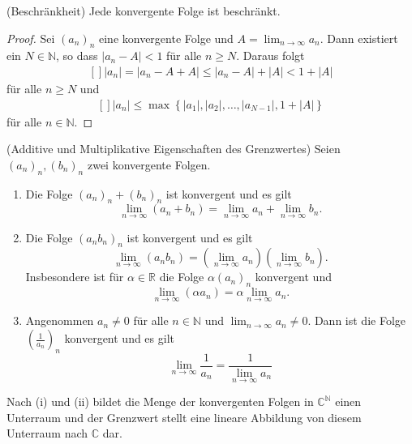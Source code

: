 \documentclass[../Analysis1_script.tex]{subfiles}
\begin{document}
\begin{lemma}{(Beschränkheit)}
	Jede konvergente Folge ist beschränkt. 
\end{lemma}

\begin{proof}
	Sei $(a_n)_{n}$ eine konvergente Folge und $A = \lim _{n\to \infty }a_n$. Dann existiert ein $N \in \mathbb {N}$, so dass $|a_n-A|<1$ für alle $n \geq N$. Daraus folgt
	\[\begin{aligned}[]
		|a_n| = |a_n - A+A| \leq |a_n-A|+|A| <1+|A|
	\end{aligned}\]
	für alle $n \geq N$ und
	\[\begin{aligned}[]
		|a_n| \leq \max \left \lbrace {|a_1|,|a_2|,\ldots ,|a_{N-1}|,1+|A|} \right \rbrace
	\end{aligned}\]
	für alle $n \in \mathbb {N}$.
\end{proof}

\begin{proposition}{(Additive und Multiplikative Eigenschaften des Grenzwertes)}\label{folg:add_and_mult}
	Seien $(a_n)_n, (b_n)_n$ zwei konvergente Folgen.
	\begin{enumerate}
		\item Die Folge $(a_n)_n + (b_n)_n$ ist konvergent und es gilt
			\[\lim_{n \to \infty}(a_n + b_n) = \lim_{n \to \infty} a_n + \lim_{n \to \infty} b_n . \]
		\item Die Folge $(a_n b_n)_n$ ist konvergent und es gilt
			\[\lim_{n \to \infty}(a_n b_n) = (\lim_{n \to \infty} a_n)(\lim_{n \to \infty} b_n) . \]
			Insbesondere ist für $\alpha \in \mathbb{R}$ die Folge $\alpha (a_n)_n$ konvergent und 
			\[\lim_{n \to \infty}(\alpha a_n) = \alpha \lim_{n \to \infty} a_n . \]
		\item Angenommen $a_n \neq 0$ für alle $n \in \mathbb{N}$ und $\lim_{n \to \infty} a_n \neq 0$. Dann ist die Folge $(\frac{1}{a_n})_n$ konvergent und es gilt
			\[\lim_{n \to \infty} \frac{1}{a_n} = \frac{1}{\lim_{n \to \infty} a_n}\]
	\end{enumerate}
	Nach (i) und (ii) bildet die Menge der konvergenten Folgen in $\mathbb{C}^\mathbb{N}$ einen Unterraum und der Grenzwert stellt eine lineare Abbildung von diesem Unterraum nach $\mathbb{C}$ dar.
\end{proposition}
 
\end{document}
